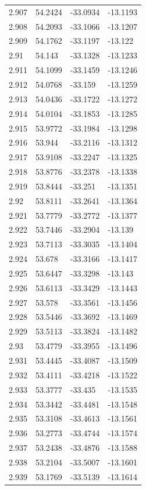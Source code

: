 \begin{tabular}{llll}
2.907 & 54.2424 & -33.0934 & -13.1193 \\
2.908 & 54.2093 & -33.1066 & -13.1207 \\
2.909 & 54.1762 & -33.1197 & -13.122 \\
2.91 & 54.143 & -33.1328 & -13.1233 \\
2.911 & 54.1099 & -33.1459 & -13.1246 \\
2.912 & 54.0768 & -33.159 & -13.1259 \\
2.913 & 54.0436 & -33.1722 & -13.1272 \\
2.914 & 54.0104 & -33.1853 & -13.1285 \\
2.915 & 53.9772 & -33.1984 & -13.1298 \\
2.916 & 53.944 & -33.2116 & -13.1312 \\
2.917 & 53.9108 & -33.2247 & -13.1325 \\
2.918 & 53.8776 & -33.2378 & -13.1338 \\
2.919 & 53.8444 & -33.251 & -13.1351 \\
2.92 & 53.8111 & -33.2641 & -13.1364 \\
2.921 & 53.7779 & -33.2772 & -13.1377 \\
2.922 & 53.7446 & -33.2904 & -13.139 \\
2.923 & 53.7113 & -33.3035 & -13.1404 \\
2.924 & 53.678 & -33.3166 & -13.1417 \\
2.925 & 53.6447 & -33.3298 & -13.143 \\
2.926 & 53.6113 & -33.3429 & -13.1443 \\
2.927 & 53.578 & -33.3561 & -13.1456 \\
2.928 & 53.5446 & -33.3692 & -13.1469 \\
2.929 & 53.5113 & -33.3824 & -13.1482 \\
2.93 & 53.4779 & -33.3955 & -13.1496 \\
2.931 & 53.4445 & -33.4087 & -13.1509 \\
2.932 & 53.4111 & -33.4218 & -13.1522 \\
2.933 & 53.3777 & -33.435 & -13.1535 \\
2.934 & 53.3442 & -33.4481 & -13.1548 \\
2.935 & 53.3108 & -33.4613 & -13.1561 \\
2.936 & 53.2773 & -33.4744 & -13.1574 \\
2.937 & 53.2438 & -33.4876 & -13.1588 \\
2.938 & 53.2104 & -33.5007 & -13.1601 \\
2.939 & 53.1769 & -33.5139 & -13.1614 \\

\end{tabular}
